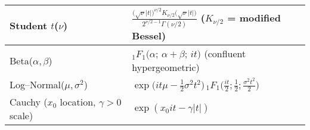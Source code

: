 \documentclass{article}
\begin{document}
\begin{table}[ht]
\begin{tabular}{@{}p{4cm} p{9.2cm}@{}}
Student $t$($\nu$) & $\displaystyle
\frac{\bigl(\sqrt{\nu}|t|\bigr)^{\nu/2}K_{\nu/2}\!\bigl(\sqrt{\nu}|t|\bigr)}
{2^{\nu/2-1}\Gamma(\nu/2)}$ \quad($K_{\nu/2}$ = modified Bessel) \\ \midrule
Beta($\alpha,\beta$) & ${}_{1}F_{1}\!\bigl(\alpha;\,\alpha+\beta;\,it\bigr)$ \quad (confluent hypergeometric) \\ \midrule
Log–Normal($\mu,\sigma^{2}$) & $\exp\!\bigl(it\mu-\tfrac{1}{2}\sigma^{2}t^{2}\bigr)\,
{}_1F_1\!\bigl(\tfrac{it}{2};\tfrac{1}{2};\tfrac{\sigma^{2}t^{2}}{2}\bigr)$ \\ \midrule
Cauchy ($x_0$ location, $\gamma>0$ scale) & $\exp(x_0it -\gamma |t|)$\\
\bottomrule
\end{tabular}
\end{table}
\end{document}
